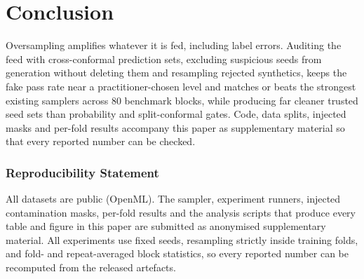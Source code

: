\documentclass[10pt]{article} %
\begin{document}
\section{Conclusion}

Oversampling amplifies whatever it is fed, including label errors. Auditing the feed with cross-conformal prediction sets, excluding suspicious seeds from generation without deleting them and resampling rejected synthetics, keeps the fake pass rate near a practitioner-chosen level and matches or beats the strongest existing samplers across 80 benchmark blocks, while producing far cleaner trusted seed sets than probability and split-conformal gates. Code, data splits, injected masks and per-fold results accompany this paper as supplementary material so that every reported number can be checked.

\subsubsection*{Reproducibility Statement}

All datasets are public (OpenML). The sampler, experiment runners, injected contamination masks, per-fold results and the analysis scripts that produce every table and figure in this paper are submitted as anonymised supplementary material. All experiments use fixed seeds, resampling strictly inside training folds, and fold- and repeat-averaged block statistics, so every reported number can be recomputed from the released artefacts.



\end{document}
